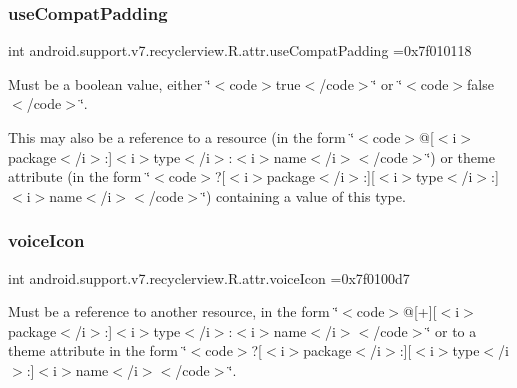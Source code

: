 \subsubsection{\texorpdfstring{use\+Compat\+Padding}{useCompatPadding}}
{\footnotesize\ttfamily int android.\+support.\+v7.\+recyclerview.\+R.\+attr.\+use\+Compat\+Padding =0x7f010118\hspace{0.3cm}{\ttfamily [static]}}

Must be a boolean value, either \char`\"{}$<$code$>$true$<$/code$>$\char`\"{} or \char`\"{}$<$code$>$false$<$/code$>$\char`\"{}. 

This may also be a reference to a resource (in the form \char`\"{}$<$code$>$@\mbox{[}$<$i$>$package$<$/i$>$\+:\mbox{]}$<$i$>$type$<$/i$>$\+:$<$i$>$name$<$/i$>$$<$/code$>$\char`\"{}) or theme attribute (in the form \char`\"{}$<$code$>$?\mbox{[}$<$i$>$package$<$/i$>$\+:\mbox{]}\mbox{[}$<$i$>$type$<$/i$>$\+:\mbox{]}$<$i$>$name$<$/i$>$$<$/code$>$\char`\"{}) containing a value of this type. \mbox{\label{classandroid_1_1support_1_1v7_1_1recyclerview_1_1R_1_1attr_ae34a0ca90a8a69d3c999302d5d714564}} 
\subsubsection{\texorpdfstring{voice\+Icon}{voiceIcon}}
{\footnotesize\ttfamily int android.\+support.\+v7.\+recyclerview.\+R.\+attr.\+voice\+Icon =0x7f0100d7\hspace{0.3cm}{\ttfamily [static]}}

Must be a reference to another resource, in the form \char`\"{}$<$code$>$@\mbox{[}+\mbox{]}\mbox{[}$<$i$>$package$<$/i$>$\+:\mbox{]}$<$i$>$type$<$/i$>$\+:$<$i$>$name$<$/i$>$$<$/code$>$\char`\"{} or to a theme attribute in the form \char`\"{}$<$code$>$?\mbox{[}$<$i$>$package$<$/i$>$\+:\mbox{]}\mbox{[}$<$i$>$type$<$/i$>$\+:\mbox{]}$<$i$>$name$<$/i$>$$<$/code$>$\char`\"{}. \mbox{\label{classandroid_1_1support_1_1v7_1_1recyclerview_1_1R_1_1attr_aa0eb0b94b9c010e44a1e95f76cb569ea}} 
